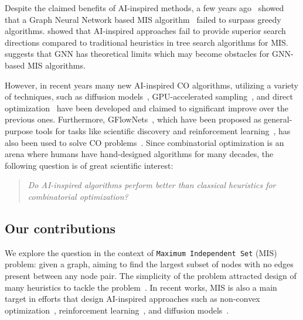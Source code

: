 Despite the claimed benefits of AI-inspired methods, a few years ago~\citet{angelini2023modern} showed that a Graph Neural Network based MIS algorithm~\citep{schuetz2022combinatorial} failed to surpass greedy algorithms.
\citet{boether_dltreesearch_2022} showed that AI-inspired approaches fail to provide superior search directions compared to traditional heuristics in tree search algorithms for MIS. \citet{gamarnik2023barriers} suggests that GNN has theoretical limits which may become obstacles for GNN-based MIS algorithms. %

However, in recent years many new AI-inspired CO algorithms, utilizing a variety of techniques, such as diffusion models~\citep{sun2023difusco, sanokowskidiffusion}, GPU-accelerated sampling~\citep{sun2023revisiting}, and direct optimization~\citep{alkhouri2024dataless} have been developed and claimed to significant improve over the previous ones. Furthermore, GFlowNets~\cite{bengio2021flow}, which have been proposed as general-purpose tools for tasks like scientific discovery and reinforcement learning~\cite{bengio2023gflownet}, has also been used to solve CO problems~\citep{zhang2023let}. Since combinatorial optimization is an arena where humans have hand-designed algorithms for many decades, the following question is of great scientific interest:
\begin{quote}
    \centering
    \emph{Do AI-inspired algorithms perform better than classical heuristics for \\combinatorial optimization?}
\end{quote}


\subsection{Our contributions}

We explore the question in the context of 
\texttt{Maximum Independent Set} (MIS) problem: given a graph, aiming to find the largest subset of nodes with no edges present between any node pair.
The simplicity of the problem attracted design of many heuristics to tackle the problem~\citep{andrade2012fast, lamm2015graph}. In recent works, MIS is also a main target in efforts that design AI-inspired approaches such as non-convex optimization~\citep{schuetz2022combinatorial, alkhouri2024dataless}, reinforcement learning~\citep{ahn2020learning, zhang2023let}, and diffusion models~\citep{sun2023difusco, sanokowskidiffusion}. 

